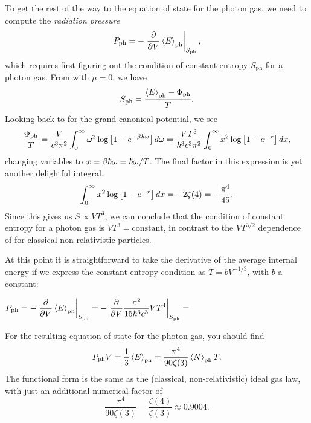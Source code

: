To get the rest of the way to the equation of state for the photon gas, we need to compute the \textit{radiation pressure}
\begin{equation*}
  P_{\text{ph}} = -\left. \frac{\partial }{\partial V} \left\langle E \right\rangle_{\text{ph}} \right|_{S_{\text{ph}}},
\end{equation*}
which requires first figuring out the condition of constant entropy $S_{\text{ph}}$ for a photon gas.
From  with $\mu = 0$, we have
\begin{equation*}
  S_{\text{ph}} = \frac{\left\langle E \right\rangle_{\text{ph}} - \Phi_{\text{ph}}}{T}.
\end{equation*}
Looking back to  for the grand-canonical potential, we see
\begin{equation*}
  \frac{\Phi_{\text{ph}}}{T} = \frac{V}{c^3 \pi^2} \int_0^{\infty} \omega^2 \log\left[1 - e^{-\beta \hbar \omega}\right] \mathop{d\omega} = \frac{VT^3}{\hbar^3 c^3 \pi^2} \int_0^{\infty} x^2 \log\left[1 - e^{-x}\right] \mathop{dx},
\end{equation*}
changing variables to $x = \beta \hbar \omega = \hbar \omega / T$.
The final factor in this expression is yet another delightful integral,
\begin{equation*}
  \int_0^{\infty} x^2 \log\left[1 - e^{-x}\right] \mathop{dx} = -2\zeta(4) = -\frac{\pi^4}{45}.
\end{equation*}
Since this gives us $S \propto VT^3$, we can conclude that the condition of constant entropy for a photon gas is $V T^3 = \mbox{constant}$, in contrast to the $V T^{3/2}$ dependence of  for classical non-relativistic particles.

At this point it is straightforward to take the derivative of the average internal energy if we express the constant-entropy condition as $T = b V^{-1 / 3}$, with $b$ a constant:
\begin{mdframed}
  $\displaystyle P_{\text{ph}} = -\left. \frac{\partial }{\partial V} \left\langle E \right\rangle_{\text{ph}} \right|_{S_{\text{ph}}} = -\left. \frac{\partial }{\partial V} \frac{\pi^2}{15 \hbar^3 c^3} V T^4 \right|_{S_{\text{ph}}} = $ \\[120 pt]
\end{mdframed}
For the resulting equation of state for the photon gas, you should find
\begin{equation}
  \label{eq:photon_eos}
  P_{\text{ph}} V = \frac{1}{3} \left\langle E \right\rangle_{\text{ph}} = \frac{\pi^4}{90\zeta(3)} \left\langle N \right\rangle_{\text{ph}} T.
\end{equation}
The functional form is the same as the (classical, non-relativistic) ideal gas law, with just an additional numerical factor of
\begin{equation*}
  \frac{\pi^4}{90\zeta(3)} = \frac{\zeta(4)}{\zeta(3)} \approx 0.9004.
\end{equation*}



